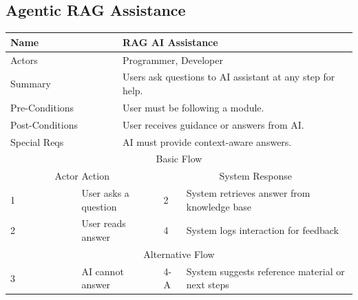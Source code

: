 \documentclass{FastFyp}
\begin{document}
\vspace{1em}

\subsection{Agentic RAG Assistance}
\noindent
\begin{minipage}{\textwidth}
\centering
{}
\label{tab:rag}
\begin{tabular}{|p{}|p{}|p{}|p{}|p{}|}
\hline
\multicolumn{2}{|p{0.15\textwidth}|}{Name} &
  \multicolumn{3}{p{0.75\textwidth}|}{RAG AI Assistance} \\ \hline
\multicolumn{2}{|p{0.15\textwidth}|}{Actors} &
  \multicolumn{3}{p{0.75\textwidth}|}{Programmer, Developer} \\ \hline
\multicolumn{2}{|p{0.15\textwidth}|}{Summary} &
  \multicolumn{3}{p{0.75\textwidth}|}{Users ask questions to AI assistant at any step for help.} \\ \hline
\multicolumn{2}{|p{0.15\textwidth}|}{Pre-Conditions} &
  \multicolumn{3}{p{0.75\textwidth}|}{User must be following a module.} \\ \hline
\multicolumn{2}{|p{0.15\textwidth}|}{Post-Conditions} &
  \multicolumn{3}{p{0.75\textwidth}|}{User receives guidance or answers from AI.} \\ \hline
\multicolumn{2}{|p{0.15\textwidth}|}{Special Reqs} &
  \multicolumn{3}{p{0.75\textwidth}|}{AI must provide context-aware answers.} \\ \hline
\multicolumn{5}{|c|}{Basic Flow} \\ \hline
\multicolumn{3}{|c|}{Actor Action} &
  \multicolumn{2}{c|}{System Response} \\ \hline
1 &
  \multicolumn{2}{p{0.42\textwidth}|}{User asks a question} &
  2 &
  System retrieves answer from knowledge base \\ \hline
2 &
  \multicolumn{2}{p{0.42\textwidth}|}{User reads answer} &
  4 &
  System logs interaction for feedback \\ \hline
\multicolumn{5}{|c|}{Alternative Flow} \\ \hline
3 &
  \multicolumn{2}{p{0.42\textwidth}|}{AI cannot answer} &
  4-A &
  System suggests reference material or next steps \\ \hline
\end{tabular}
\end{minipage}
\end{document}
